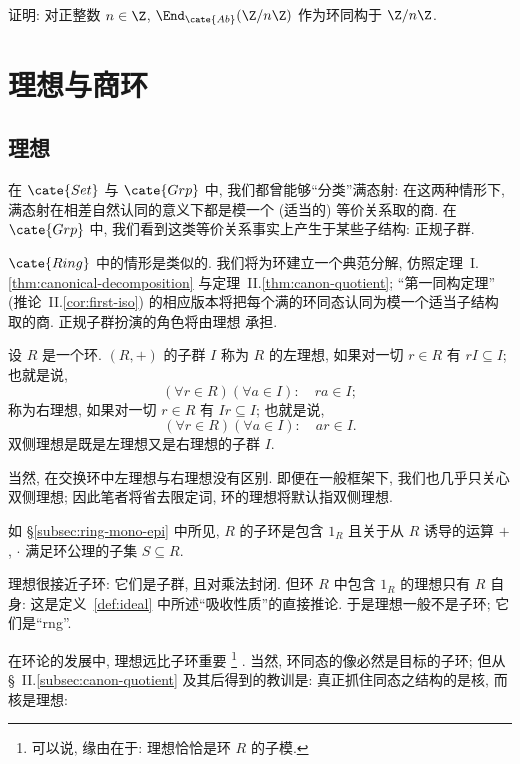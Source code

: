 \begin{prob}
\label{ex:end-zn}
证明: 对正整数 $n \in \Z$, $\End_{\cate{Ab}}(\Z/n\Z)$ 作为环同构于 $\Z/n\Z$.
\end{prob}

\section{理想与商环}
\label{subsec:ideals}

\subsection{理想}
\label{subsec:ideals-def}

在 $\cate{Set}$ 与 $\cate{Grp}$ 中, 我们都曾能够``分类''满态射: 在这两种情形下, 满态射在相差自然认同的意义下都是模一个 (适当的) 等价关系取的商. 在 $\cate{Grp}$ 中, 我们看到这类等价关系事实上产生于某些子结构: 正规子群.

$\cate{Ring}$ 中的情形是类似的. 我们将为环建立一个典范分解, 仿照定理~I.\ref{thm:canonical-decomposition} 与定理~II.\ref{thm:canon-quotient}; ``第一同构定理'' (推论~II.\ref{cor:first-iso}) 的相应版本将把每个满的环同态认同为模一个适当子结构取的商. 正规子群扮演的角色将由理想%
承担.

\begin{definition}
\label{def:ideal}
设 $R$ 是一个环. $(R, +)$ 的子群 $I$ 称为 $R$ 的左理想, 如果对一切 $r \in R$ 有 $rI \subseteq I$; 也就是说,
\[
(\forall r \in R) (\forall a \in I): \quad ra \in I;
\]
称为右理想, 如果对一切 $r \in R$ 有 $Ir \subseteq I$; 也就是说,
\[
(\forall r \in R) (\forall a \in I): \quad ar \in I.
\]
双侧理想是既是左理想又是右理想的子群 $I$.
\end{definition}

当然, 在交换环中左理想与右理想没有区别. 即便在一般框架下, 我们也几乎只关心双侧理想; 因此笔者将省去限定词, 环的理想将默认指双侧理想.

\begin{remark}
\label{rem:ideals-not-subrings}
如 \S\ref{subsec:ring-mono-epi} 中所见, $R$ 的子环是包含 $1_R$ 且关于从 $R$ 诱导的运算 $+$, $\cdot$ 满足环公理的子集 $S \subseteq R$.

理想很接近子环: 它们是子群, 且对乘法封闭. 但环 $R$ 中包含 $1_R$ 的理想只有 $R$ 自身: 这是定义~\ref{def:ideal} 中所述``吸收性质''的直接推论. 于是理想一般不是子环; 它们是``rng''.

在环论的发展中, 理想远比子环重要%
\footnote{可以说, 缘由在于: 理想恰恰是环 $R$ 的子模.}%
. 当然, 环同态的像必然是目标的子环; 但从 \S~II.\ref{subsec:canon-quotient} 及其后得到的教训是: 真正抓住同态之结构的是核, 而核是理想:
\end{remark}

